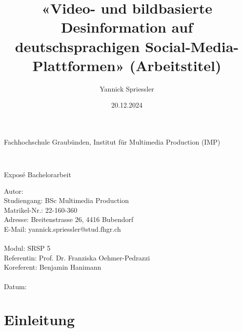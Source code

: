 \documentclass[12pt,a4paper]{article}        %
\title{«Video- und bildbasierte Desinformation auf deutschsprachigen Social-Media-Plattformen» (Arbeitstitel)}        %
\author{Yannick Spriessler}     %
\date{20.12.2024}     %
\begin{document}
\begin{titlingpage} %
  \begin{center}
    \begin{large}
      Fachhochschule Graubünden, Institut für Multimedia Production (IMP)\\ %
    \end{large}
    \vspace{2cm} %
    \begin{LARGE}
      \textbf{\thetitle} \\
    \end{LARGE}
    \vspace{1cm}
    \begin{large}
      Exposé Bachelorarbeit\\
    \end{large}
    \vspace{5cm} %
    Autor: \theauthor \\
    Studiengang: BSc Multimedia Production \\
    Matrikel-Nr.: 22-160-360 \\
    Adresse: Breitenstrasse 26, 4416 Bubendorf \\
    E-Mail: yannick.spriessler@stud.fhgr.ch \\ \\
    Modul: SRSP 5 \\
    Referentin: Prof. Dr. Franziska Oehmer-Pedrazzi \\
    Koreferent: Benjamin Hanimann \\ \\
    Datum: \thedate
  \end{center}
\end{titlingpage}


\section{Einleitung}
\end{document}
